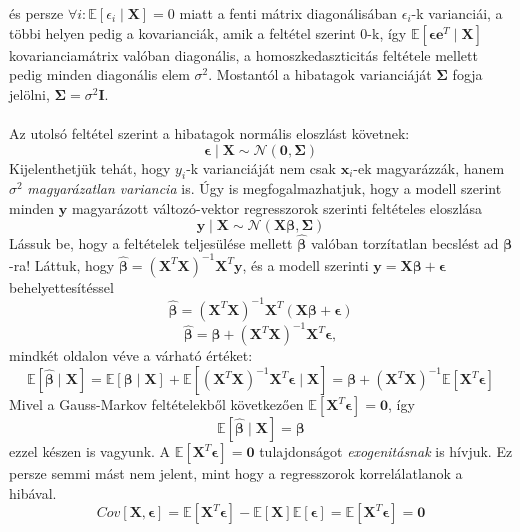 \documentclass[14p]{report}
\def\pmb{\boldsymbol}
\def\ebeta{\hat{\pmb{\beta}}}
\def\e{\epsilon}
\begin{document}
	és persze $\forall i : \mathbb{E}[\e_i \mid \pmb{X}] = 0$ miatt a fenti mátrix diagonálisában $\e_i$-k varianciái, a többi helyen pedig a kovarianciák, amik a feltétel szerint $0$-k, így $\mathbb{E}[\pmb{\e}\pmb{e}^T \mid \pmb{X}]$ kovarianciamátrix valóban diagonális, a homoszkedaszticitás feltétele mellett pedig minden diagonális elem $\sigma^2$. Mostantól a hibatagok varianciáját $\pmb{\Sigma}$ fogja jelölni, $\pmb{\Sigma} = \sigma^2\pmb{I}$.
	\\
	\\
	Az utolsó feltétel szerint a hibatagok normális eloszlást követnek:
	\[
	\pmb{\e} \mid \pmb{X} \sim \mathcal{N}(\pmb{0}, \pmb{\Sigma})
	\]
	Kijelenthetjük tehát, hogy $y_i$-k varianciáját nem csak $\pmb{x}_i$-ek magyarázzák, hanem $\sigma^2$ \emph{magyarázatlan variancia} is. Úgy is megfogalmazhatjuk, hogy a modell szerint minden $\pmb{y}$ magyarázott változó-vektor regresszorok szerinti feltételes eloszlása
	\[
	\pmb{y} \mid \pmb{X} \sim \mathcal{N}(\pmb{X}\pmb{\beta}, \pmb{\Sigma})
	\]
	Lássuk be, hogy a feltételek teljesülése mellett $\ebeta$ valóban torzítatlan becslést ad $\pmb{\beta}$-ra! Láttuk, hogy $\ebeta = (\pmb{X}^T\pmb{X})^{-1}\pmb{X}^T\pmb{y}$, és a modell szerinti $\pmb{y} = \pmb{X}\pmb{\beta} + \pmb{\e}$ behelyettesítéssel
	\[
	\ebeta = (\pmb{X}^T\pmb{X})^{-1}\pmb{X}^T(\pmb{X}\pmb{\beta} + \pmb{\e})
	\]
	\[
	\ebeta = \pmb{\beta} + (\pmb{X}^T\pmb{X})^{-1}\pmb{X}^T\pmb{\e},
	\]
	mindkét oldalon véve a várható értéket:
	\[
	\mathbb{E}[\ebeta \mid \pmb{X}] = \mathbb{E}[\pmb{\beta} \mid \pmb{X}] + \mathbb{E}[(\pmb{X}^T\pmb{X})^{-1}\pmb{X}^T\pmb{\e} \mid \pmb{X}] = \pmb{\beta} + (\pmb{X}^T\pmb{X})^{-1}\mathbb{E}[\pmb{X}^T\pmb{\e}]
	\]
	Mivel a Gauss-Markov feltételekből következően $\mathbb{E}[\pmb{X}^T\pmb{\e}] = \pmb{0}$, így
	\[
	\mathbb{E}[\ebeta \mid \pmb{X}] = \pmb{\beta}
	\]
	ezzel készen is vagyunk. A $\mathbb{E}[\pmb{X}^T\pmb{\e}] = \pmb{0}$ tulajdonságot \emph{exogenitásnak} is hívjuk. Ez persze semmi mást nem jelent, mint hogy a regresszorok korrelálatlanok a hibával.
	\[
		Cov[\pmb{X}, \pmb{\e}] = \mathbb{E}[\pmb{X}^T\pmb{\e}] - \mathbb{E}[\pmb{X}]\mathbb{E}[\pmb{\e}] = \mathbb{E}[\pmb{X}^T\pmb{\e}] = \pmb{0}
	\]
	
\end{document}
